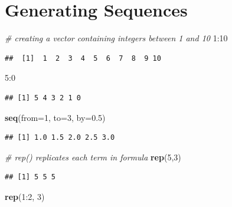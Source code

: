 \documentclass[]{book}
\newenvironment{Shaded}{\begin{snugshade}}{\end{snugshade}}
\newcommand{\KeywordTok}[1]{\textcolor[rgb]{0.13,0.29,0.53}{\textbf{{#1}}}}
\newcommand{\DataTypeTok}[1]{\textcolor[rgb]{0.13,0.29,0.53}{{#1}}}
\newcommand{\DecValTok}[1]{\textcolor[rgb]{0.00,0.00,0.81}{{#1}}}
\newcommand{\FloatTok}[1]{\textcolor[rgb]{0.00,0.00,0.81}{{#1}}}
\newcommand{\CommentTok}[1]{\textcolor[rgb]{0.56,0.35,0.01}{\textit{{#1}}}}
\newcommand{\NormalTok}[1]{{#1}}
\begin{document}
\section{Generating Sequences}\label{generating-sequences}

\begin{Shaded}
\begin{Highlighting}[]
\CommentTok{# creating a vector containing integers between 1 and 10}
\DecValTok{1}\NormalTok{:}\DecValTok{10} 
\end{Highlighting}
\end{Shaded}

\begin{verbatim}
##  [1]  1  2  3  4  5  6  7  8  9 10
\end{verbatim}

\begin{Shaded}
\begin{Highlighting}[]
\DecValTok{5}\NormalTok{:}\DecValTok{0}
\end{Highlighting}
\end{Shaded}

\begin{verbatim}
## [1] 5 4 3 2 1 0
\end{verbatim}

\begin{Shaded}
\begin{Highlighting}[]
\KeywordTok{seq}\NormalTok{(}\DataTypeTok{from=}\DecValTok{1}\NormalTok{, }\DataTypeTok{to=}\DecValTok{3}\NormalTok{, }\DataTypeTok{by=}\FloatTok{0.5}\NormalTok{)}
\end{Highlighting}
\end{Shaded}

\begin{verbatim}
## [1] 1.0 1.5 2.0 2.5 3.0
\end{verbatim}

\begin{Shaded}
\begin{Highlighting}[]
\CommentTok{# rep() replicates each term in formula}
\KeywordTok{rep}\NormalTok{(}\DecValTok{5}\NormalTok{,}\DecValTok{3}\NormalTok{)}
\end{Highlighting}
\end{Shaded}

\begin{verbatim}
## [1] 5 5 5
\end{verbatim}

\begin{Shaded}
\begin{Highlighting}[]
\KeywordTok{rep}\NormalTok{(}\DecValTok{1}\NormalTok{:}\DecValTok{2}\NormalTok{, }\DecValTok{3}\NormalTok{)}
\end{Highlighting}
\end{Shaded}
\end{document}
